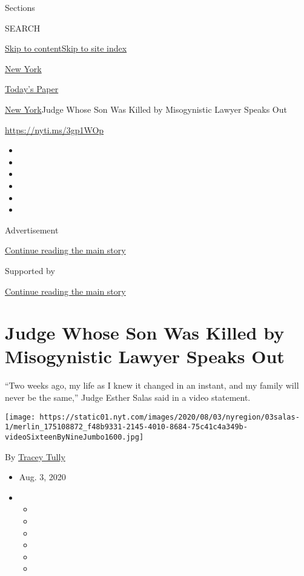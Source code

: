 Sections

SEARCH

\protect\hyperlink{site-content}{Skip to
content}\protect\hyperlink{site-index}{Skip to site index}

\href{https://www.nytimes.com/section/nyregion}{New York}

\href{https://myaccount.nytimes.com/auth/login?response_type=cookie\&client_id=vi}{}

\href{https://www.nytimes.com/section/todayspaper}{Today's Paper}

\href{/section/nyregion}{New York}\textbar{}Judge Whose Son Was Killed
by Misogynistic Lawyer Speaks Out

\url{https://nyti.ms/3gp1WOp}

\begin{itemize}
\item
\item
\item
\item
\item
\item
\end{itemize}

Advertisement

\protect\hyperlink{after-top}{Continue reading the main story}

Supported by

\protect\hyperlink{after-sponsor}{Continue reading the main story}

\hypertarget{judge-whose-son-was-killed-by-misogynistic-lawyer-speaks-out}{%
\section{Judge Whose Son Was Killed by Misogynistic Lawyer Speaks
Out}\label{judge-whose-son-was-killed-by-misogynistic-lawyer-speaks-out}}

``Two weeks ago, my life as I knew it changed in an instant, and my
family will never be the same,'' Judge Esther Salas said in a video
statement.

\texttt{[image: https://static01.nyt.com/images/2020/08/03/nyregion/03salas-1/merlin\_175108872\_f48b9331-2145-4010-8684-75c41c4a349b-videoSixteenByNineJumbo1600.jpg]}

By \href{https://www.nytimes.com/by/tracey-tully}{Tracey Tully}

\begin{itemize}
\item
  Aug. 3, 2020
\item
  \begin{itemize}
  \item
  \item
  \item
  \item
  \item
  \item
  \end{itemize}
\end{itemize}

